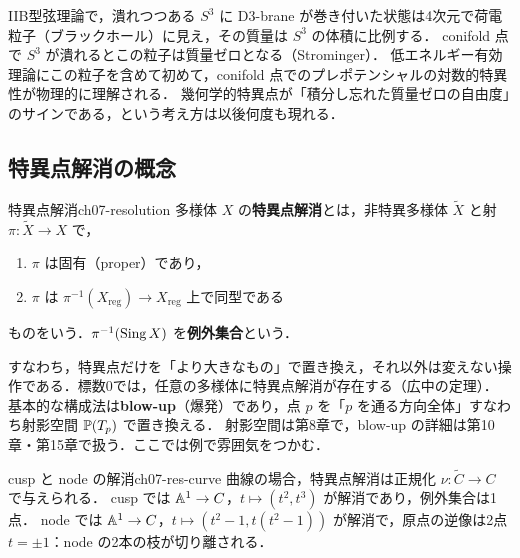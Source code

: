\begin{physbox}
IIB型弦理論で，潰れつつある $S^3$ に D3-brane が巻き付いた状態は4次元で荷電粒子（ブラックホール）に見え，その質量は $S^3$ の体積に比例する．
conifold 点で $S^3$ が潰れるとこの粒子は質量ゼロとなる（Strominger）．
低エネルギー有効理論にこの粒子を含めて初めて，conifold 点でのプレポテンシャルの対数的特異性が物理的に理解される．
幾何学的特異点が「積分し忘れた質量ゼロの自由度」のサインである，という考え方は以後何度も現れる．
\end{physbox}

\subsection{特異点解消の概念}

\begin{mydef}{特異点解消}{ch07-resolution}
多様体 $X$ の\textbf{特異点解消}とは，非特異多様体 $\tilde X$ と射 $\pi:\tilde X\to X$ で，
\begin{enumerate}
  \item $\pi$ は固有（proper）であり，
  \item $\pi$ は $\pi^{-1}(X_{\mathrm{reg}})\to X_{\mathrm{reg}}$ 上で同型である
\end{enumerate}
ものをいう．$\pi^{-1}(\operatorname{Sing} X)$ を\textbf{例外集合}という．
\end{mydef}

すなわち，特異点だけを「より大きなもの」で置き換え，それ以外は変えない操作である．標数0では，任意の多様体に特異点解消が存在する（広中の定理）．
基本的な構成法は\textbf{blow-up}（爆発）であり，点 $p$ を「$p$ を通る方向全体」すなわち射影空間 $\mathbb{P}(T_p)$ で置き換える．
射影空間は第8章で，blow-up の詳細は第10章・第15章で扱う．ここでは例で雰囲気をつかむ．

\begin{myex}{cusp と node の解消}{ch07-res-curve}
曲線の場合，特異点解消は正規化 $\nu:\tilde C\to C$ で与えられる．
cusp では $\mathbb{A}^1\to C$，$t\mapsto(t^2,t^3)$ が解消であり，例外集合は1点．
node では $\mathbb{A}^1\to C$，$t\mapsto(t^2-1,t(t^2-1))$ が解消で，原点の逆像は2点 $t=\pm1$：node の2本の枝が切り離される．
\end{myex}

